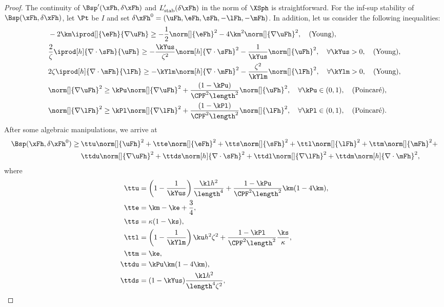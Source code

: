 \begin{proof}
The continuity of $\Bsp'(\xFh,\delta\xFh)$ and $L'_{\mathrm{stab}}(\delta\xFh)$ in the norm of $\XSph$ is straightforward. For the inf-sup stability of $\Bsp(\xFh,\delta\xFh)$, 
let $\Pt$ be $I$ and set 
$\delta\xFh^0 = (\uFh,\eFh,\sFh,-\lFh,-\mFh)$.
In addition, let us consider the following inequalities:
\begin{align*}
& -2\km\iprod[]{\eFh}{\nabla\uFh} \geq -\frac12\norm[]{\eFh}^2-4\km^2\norm[]{\nabla\uFh}^2, \quad\text{(Young)}, \\
%
& \frac{2}{\zeta}\iprod[h]{\nabla\cdot\sFh}{\uFh} \geq -\frac{\kYus}{\zeta^2}\norm[h]{\nabla\cdot \sFh}^2-\frac{1}{\kYus}\norm[]{\uFh}^2,\quad\forall\kYus > 0, \quad\text{(Young)},\\
%
& 2\zeta\iprod[h]{\nabla\cdot\mFh}{\lFh} \geq -\kYlm\norm[h]{\nabla\cdot\mFh}^2-\frac{\zeta^2}{\kYlm}\norm[]{\lFh}^2,\quad \forall\kYlm > 0,\quad\text{(Young)},\\
%
& \norm[]{\nabla\uFh}^2 \geq \kPu\norm[]{\nabla\uFh}^2+\frac{(1-\kPu)}{\CPF^2\length^2}\norm[]{\uFh}^2,\quad \forall\kPu\in(0, 1),\quad\text{(Poincaré)},\\
%
& \norm[]{\nabla\lFh}^2 \geq \kPl\norm[]{\nabla\lFh}^2+\frac{(1-\kPl)}{\CPF^2\length^2}\norm[]{\lFh}^2,\quad \forall\kPl\in(0, 1),\quad\text{(Poincaré)}.
\end{align*}
After some algebraic manipulations, we arrive at
\begin{align*}
\Bsp(\xFh,\delta\xFh^0) \geq 
&\: \ttu\norm[]{\uFh}^2+
    \tte\norm[]{\eFh}^2+
    \tts\norm[]{\sFh}^2+
    \ttl\norm[]{\lFh}^2+
    \ttm\norm[]{\mFh}^2+
    \\    
&\: \ttdu\norm[]{\nabla\uFh}^2+
    \ttds\norm[h]{\nabla\cdot\sFh}^2+ 
    \ttdl\norm[]{\nabla\lFh}^2+
    \ttdm\norm[h]{\nabla\cdot\mFh}^2,
\end{align*}
where
\begin{align*}
    \ttu &= \left(1-\frac{1}{\kYus}\right)\frac{\kl h^2}{\length^4}+\frac{1-\kPu}{\CPF^2\length^2}\km(1-4\km),\\
    \tte &= \km
    -\ke+\frac34,\\
    \tts &= \kappa(1-\ks),\\
    \ttl &= \left(1-\frac{1}{\kYlm}\right)\ku h^2\zeta^2+\frac{1-\kPl}{\CPF^2\length^2}\frac{\ks}{\kappa},\\
    \ttm &= \ke,\\
    \ttdu &= \kPu\km(1-4\km),\\
    \ttds &= (1-\kYus)\frac{\kl h^2}{\length^4\zeta^2},\\

\end{align*}
\end{proof}
